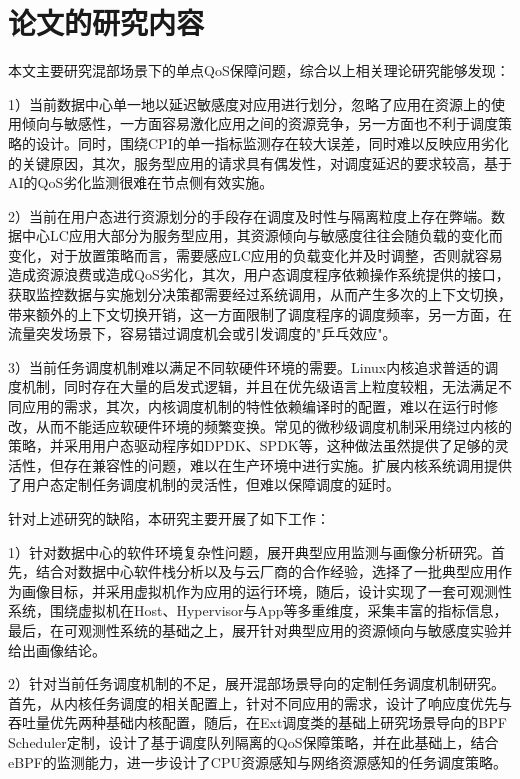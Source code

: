 \section{论文的研究内容}

本文主要研究混部场景下的单点QoS保障问题，综合以上相关理论研究能够发现：

1）当前数据中心单一地以延迟敏感度对应用进行划分，忽略了应用在资源上的使用倾向与敏感性，一方面容易激化应用之间的资源竞争，另一方面也不利于调度策略的设计。同时，围绕CPI的单一指标监测存在较大误差，同时难以反映应用劣化的关键原因，其次，服务型应用的请求具有偶发性，对调度延迟的要求较高，基于AI的QoS劣化监测很难在节点侧有效实施。

2）当前在用户态进行资源划分的手段存在调度及时性与隔离粒度上存在弊端。数据中心LC应用大部分为服务型应用，其资源倾向与敏感度往往会随负载的变化而变化，对于放置策略而言，需要感应LC应用的负载变化并及时调整，否则就容易造成资源浪费或造成QoS劣化，其次，用户态调度程序依赖操作系统提供的接口，获取监控数据与实施划分决策都需要经过系统调用，从而产生多次的上下文切换，带来额外的上下文切换开销，这一方面限制了调度程序的调度频率，另一方面，在流量突发场景下，容易错过调度机会或引发调度的"乒乓效应"。

3）当前任务调度机制难以满足不同软硬件环境的需要。Linux内核追求普适的调度机制，同时存在大量的启发式逻辑，并且在优先级语言上粒度较粗，无法满足不同应用的需求，其次，内核调度机制的特性依赖编译时的配置，难以在运行时修改，从而不能适应软硬件环境的频繁变换。常见的微秒级调度机制采用绕过内核的策略，并采用用户态驱动程序如DPDK、SPDK等，这种做法虽然提供了足够的灵活性，但存在兼容性的问题，难以在生产环境中进行实施。扩展内核系统调用提供了用户态定制任务调度机制的灵活性，但难以保障调度的延时。

针对上述研究的缺陷，本研究主要开展了如下工作：

1）针对数据中心的软件环境复杂性问题，展开典型应用监测与画像分析研究。首先，结合对数据中心软件栈分析以及与云厂商的合作经验，选择了一批典型应用作为画像目标，并采用虚拟机作为应用的运行环境，随后，设计实现了一套可观测性系统，围绕虚拟机在Host、Hypervisor与App等多重维度，采集丰富的指标信息，最后，在可观测性系统的基础之上，展开针对典型应用的资源倾向与敏感度实验并给出画像结论。

2）针对当前任务调度机制的不足，展开混部场景导向的定制任务调度机制研究。首先，从内核任务调度的相关配置上，针对不同应用的需求，设计了响应度优先与吞吐量优先两种基础内核配置，随后，在Ext调度类的基础上研究场景导向的BPF Scheduler定制，设计了基于调度队列隔离的QoS保障策略，并在此基础上，结合eBPF的监测能力，进一步设计了CPU资源感知与网络资源感知的任务调度策略。

